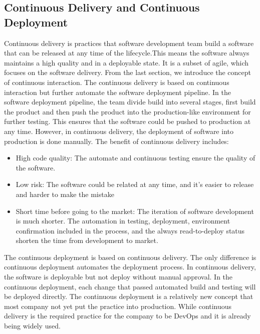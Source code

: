 \subsection{Continuous Delivery and Continuous Deployment}
\label{CD}
Continuous delivery is practices that software development team build a software that can be released at any time of the lifecycle.\cite{fowler2013continuous}This means the software always maintains a high quality and in a deployable state.\cite{WhatisCo47:online} It is a subset of agile, which focuses on the software delivery.\cite{Continuo97:online} From the last section, we introduce the concept of continuous interaction. The continuous delivery is based on continuous interaction but further automate the software deployment pipeline. In the software deployment pipeline, the team divide build into several stages, first build the product and then push the product into the production-like environment for further testing. This ensures that the software could be pushed to production at any time. However, in continuous delivery, the deployment of software into production is done manually.
The benefit of continuous delivery includes:\cite{WhatisCo47:online}\cite{fowler2013continuous}
\begin{itemize}
    \item High code quality: The automate and continuous testing ensure the quality of the software.
    \item Low risk: The software could be related at any time, and it's easier to release and harder to make the mistake
    \item Short time before going to the market: The iteration of software development is much shorter. The automation in testing, deployment, environment confirmation included in the process, and the always read-to-deploy status shorten the time from development to market.
\end{itemize}
The continuous deployment is based on continuous delivery. The only difference is continuous deployment automates the deployment process. In continuous delivery, the software is deployable but not deploy without manual approval. In the continuous deployment, each change that passed automated build and testing will be deployed directly. The continuous deployment is a relatively new concept that most company not yet put the practice into production.\cite{leppanen2015highways} While continuous delivery is the required practice for the company to be DevOps and it is already being widely used.

